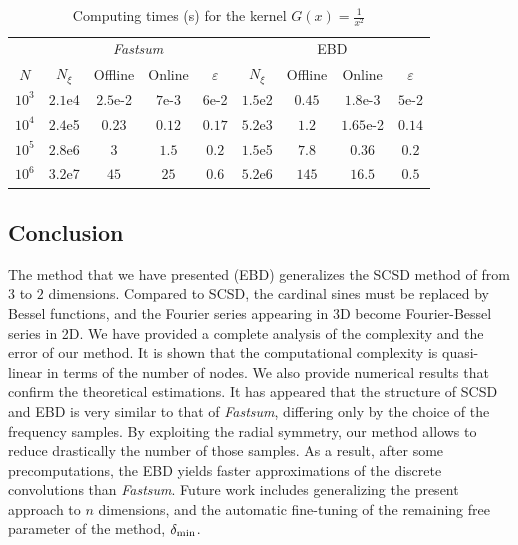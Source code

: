 \documentclass[main]{subfiles}
\begin{document}
\begin{table}[t]
	\centering
	\caption{Computing times (s) for the kernel $G(x) = \frac{1}{x^2}$}
	\begin{tabular}{*9c}
		\toprule
		&  \multicolumn{4}{c}{\textit{Fastsum}} & \multicolumn{4}{c}{EBD}\\
		\cmidrule(lr){2-5}\cmidrule(lr){6-9}
		$N$   & $N_\xi$ & Offline   & Online    & $\varepsilon$ & $N_\xi$ & Offline   & Online  & $\varepsilon$ \\
		$10^3$   &  $2.1$e4 &  $2.5$e-2  & $7$e-3  & $6$e-2 & $1.5$e2 & $ 0.45$ & $1.8$e-3 & $5$e-2 \\
		$10^4$   & $2.4$e5 & $0.23$ & $0.12$  & $0.17$ 
		& $5.2$e3 & $1.2$ & $1.65$e-2 & $0.14$\\
		$10^5$  &  $2.8$e6 & $3$  & $1.5$  & $0.2$ & 
		$1.5$e5 & $7.8$ & $0.36$ & $0.2$\\
		$10^6$ & $3.2$e7  & $45$ & $25$  & 0.6& 
		$5.2$e6  & $145$ & $16.5$ & $0.5$\\
		\bottomrule
	\end{tabular}
\end{table}
\subsection*{Conclusion}
The method that we have presented (EBD) generalizes the SCSD method of \cite{Alouges2015} from $3$ to $2$ dimensions. Compared to SCSD, the cardinal sines must be replaced by Bessel functions, and the Fourier series appearing in 3D become Fourier-Bessel series in 2D. We have provided a complete analysis of the complexity and the error of our method. It is shown that the computational complexity is quasi-linear in terms of the number of nodes. We also provide numerical results that confirm the theoretical estimations. It has appeared that the structure of SCSD and EBD is very similar to that of \textit{Fastsum}, differing only by the choice of the frequency samples. By exploiting the radial symmetry, our method allows to reduce drastically the number of those samples. As a result, after some precomputations, the EBD yields faster approximations of the discrete convolutions than \textit{Fastsum}. Future work includes generalizing the present approach to $n$ dimensions, and the automatic fine-tuning of the remaining free parameter of the method, $\delta_{\min}$.



\end{document}
